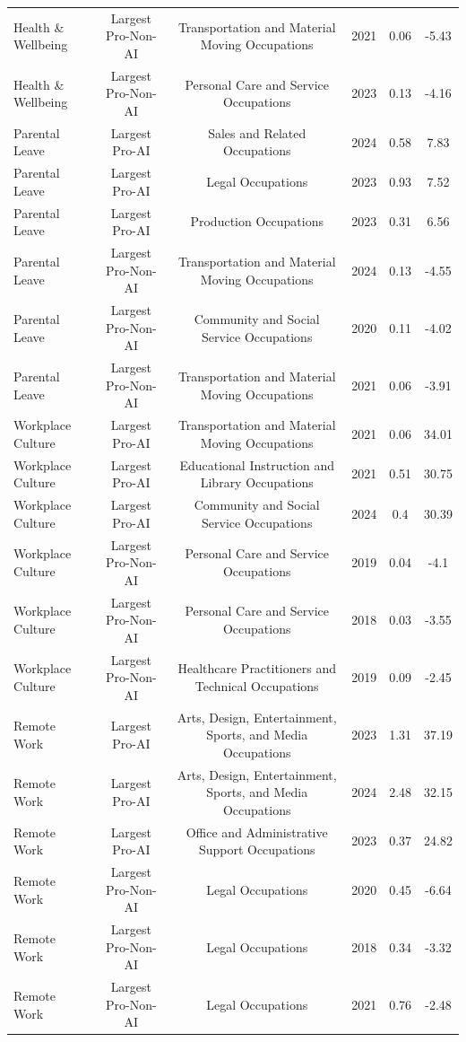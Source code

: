 \begin{table}[htbp]
\begin{tabular}{lccccc}
Health \& Wellbeing & Largest Pro-Non-AI & Transportation and Material Moving Occupations & 2021 & 0.06 & -5.43 \\
Health \& Wellbeing & Largest Pro-Non-AI & Personal Care and Service Occupations & 2023 & 0.13 & -4.16 \\
Parental Leave & Largest Pro-AI & Sales and Related Occupations & 2024 & 0.58 & 7.83 \\
Parental Leave & Largest Pro-AI & Legal Occupations & 2023 & 0.93 & 7.52 \\
Parental Leave & Largest Pro-AI & Production Occupations & 2023 & 0.31 & 6.56 \\
Parental Leave & Largest Pro-Non-AI & Transportation and Material Moving Occupations & 2024 & 0.13 & -4.55 \\
Parental Leave & Largest Pro-Non-AI & Community and Social Service Occupations & 2020 & 0.11 & -4.02 \\
Parental Leave & Largest Pro-Non-AI & Transportation and Material Moving Occupations & 2021 & 0.06 & -3.91 \\
Workplace Culture & Largest Pro-AI & Transportation and Material Moving Occupations & 2021 & 0.06 & 34.01 \\
Workplace Culture & Largest Pro-AI & Educational Instruction and Library Occupations & 2021 & 0.51 & 30.75 \\
Workplace Culture & Largest Pro-AI & Community and Social Service Occupations & 2024 & 0.4 & 30.39 \\
Workplace Culture & Largest Pro-Non-AI & Personal Care and Service Occupations & 2019 & 0.04 & -4.1 \\
Workplace Culture & Largest Pro-Non-AI & Personal Care and Service Occupations & 2018 & 0.03 & -3.55 \\
Workplace Culture & Largest Pro-Non-AI & Healthcare Practitioners and Technical Occupations & 2019 & 0.09 & -2.45 \\
Remote Work & Largest Pro-AI & Arts, Design, Entertainment, Sports, and Media Occupations & 2023 & 1.31 & 37.19 \\
Remote Work & Largest Pro-AI & Arts, Design, Entertainment, Sports, and Media Occupations & 2024 & 2.48 & 32.15 \\
Remote Work & Largest Pro-AI & Office and Administrative Support Occupations & 2023 & 0.37 & 24.82 \\
Remote Work & Largest Pro-Non-AI & Legal Occupations & 2020 & 0.45 & -6.64 \\
Remote Work & Largest Pro-Non-AI & Legal Occupations & 2018 & 0.34 & -3.32 \\
Remote Work & Largest Pro-Non-AI & Legal Occupations & 2021 & 0.76 & -2.48 \\
\hline\hline
\end{tabular}
\end{table}
